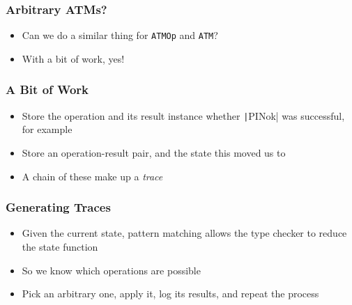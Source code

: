 \documentclass[compress,handout]{beamer}
\begin{document}
\begin{frame}[fragile]
  \frametitle{Arbitrary ATMs?}

  \begin{itemize}
    \item<1-> Can we do a similar thing for \texttt{ATMOp} and
              \texttt{ATM}?
    \item<2-> With a bit of work, yes!
  \end{itemize}

\end{frame}


\begin{frame}[fragile]
  \frametitle{A Bit of Work}

  \begin{itemize}
    \item<1-> Store the operation and its result instance {\textemdash}
              whether \texttt|PINok| was successful, for example
    \item<2-> Store an operation-result pair, and the state this moved
              us to
    \item<3-> A chain of these make up a \emph{trace}
  \end{itemize}

\end{frame}


\begin{frame}
  \frametitle{Generating Traces}

  \begin{itemize}
    \item<1-> Given the current state, pattern matching allows the type checker
              to reduce the state function
    \item<2-> So we know which operations are possible
    \item<3-> Pick an arbitrary one, apply it, log its results, and repeat the
              process
  \end{itemize}


\end{frame}
\end{document}
